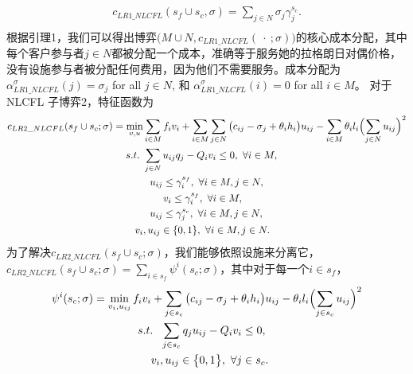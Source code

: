 \documentclass[UTF8]{article}
\begin{document}
\begin{定义}
\begin{eqnarray}
\begin{aligned}
      \begin{split}
      c_{LR1\_NLCFL}(s_f \cup s_c,\sigma) = \sum_{j \in N} \sigma_j\gamma_j^{s_c}.
      \end{split}
      \end{aligned}
      \end{eqnarray}
      根据引理1，我们可以得出博弈$\big(M \cup N, c_{LR1\_NLCFL}(\ \cdot \ ;\sigma)\big)$的核心成本分配，其中每个客户参与者$j \in N$都被分配一个成本，准确等于服务她的拉格朗日对偶价格，没有设施参与者被分配任何费用，因为他们不需要服务。成本分配为$\alpha_{LR1\_NLCFL}^{\sigma}(j) = \sigma_j$ for all $j \in N$, 和 $\alpha_{LR1\_NLCFL}^{\sigma}(i) = 0$ for all $i \in M$。
      对于NLCFL 子博弈2，特征函数为
      \begin{eqnarray*}
      \begin{aligned}
      \begin{split}
      c_{LR2\_NLCFL}(s_f \cup s_c;\sigma) = \min_{v,u}& \sum_{i \in M} f_iv_i + \sum_{i \in M}\sum_{j \in N} \big(c_{ij} - \sigma_j + \theta_ih_i\big) u_{ij} - \sum_{i \in M} \theta_il_i \Bigl( \sum_{j \in N}u_{ij}\Bigr)^2\\
      s.t.~&\sum_{j \in N}u_{ij}q_j - Q_iv_i \leq 0,~\forall i \in M,\\
      ~~~~&~~u_{ij} \leq \gamma_i^{s_f},~\forall i \in M, j \in N,\\
      &~~~~~~v_i \leq \gamma_i^{s_f},~\forall i \in M,\\
      ~~~~&~~u_{ij} \leq \gamma_j^{s_c},~\forall i \in M, j \in N,\\
      v_i&, u_{ij} \in \{0,1\}, ~\forall i \in M, j \in N.
      \end{split}
      \end{aligned}
      \end{eqnarray*}
      为了解决$c_{LR2\_NLCFL}(s_f \cup s_c;\sigma)$，我们能够依照设施来分离它，$c_{LR2\_NLCFL}(s_f \cup s_c;\sigma) = \sum_{i \in s_f} \psi^i(s_c;\sigma)$，其中对于每一个$i \in s_f$，
      \begin{eqnarray}\label{eqn:psi}
      \begin{aligned}
      \begin{split}
      \psi^i(s_c;\sigma) = \min_{v_i,u_{ij}} f_iv_i + \sum_{j \in s_c} \big(c_{ij} - \sigma_j + \theta_ih_i\big)& u_{ij} - \theta_il_i \Bigl( \sum_{j \in s_c}u_{ij}\Bigr)^2\\
      s.t. ~~ \sum_{j \in s_c}q_ju_{ij} - Q_iv_i \leq 0,&\\
      v_i,u_{ij} \in \big\{0,1\big\},~\forall j \in s_c&.

\end{split}
\end{aligned}
\end{eqnarray}
\end{定义}
\end{document}
